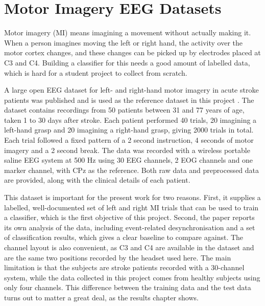 \section{Motor Imagery EEG Datasets}

Motor imagery (MI) means imagining a movement without actually making it. When a person
imagines moving the left or right hand, the activity over the motor cortex changes, and
these changes can be picked up by electrodes placed at C3 and C4. Building a classifier for
this needs a good amount of labelled data, which is hard for a student project to collect
from scratch.

A large open EEG dataset for left- and right-hand motor imagery in acute stroke patients
was published and is used as the reference dataset in this project \cite{liu2024mi}. The
dataset contains recordings from 50 patients between 31 and 77 years of age, taken 1 to 30
days after stroke. Each patient performed 40 trials, 20 imagining a left-hand grasp and 20
imagining a right-hand grasp, giving 2000 trials in total. Each trial followed a fixed
pattern of a 2 second instruction, 4 seconds of motor imagery and a 2 second break. The
data was recorded with a wireless portable saline EEG system at 500 Hz using 30 EEG
channels, 2 EOG channels and one marker channel, with CPz as the reference. Both raw data
and preprocessed data are provided, along with the clinical details of each patient.

This dataset is important for the present work for two reasons. First, it supplies a
labelled, well-documented set of left and right MI trials that can be used to train a
classifier, which is the first objective of this project. Second, the paper reports its own
analysis of the data, including event-related desynchronisation and a set of classification
results, which gives a clear baseline to compare against. The channel layout is also
convenient, as C3 and C4 are available in the dataset and are the same two positions
recorded by the headset used here. The main limitation is that the subjects are stroke
patients recorded with a 30-channel system, while the data collected in this project comes
from healthy subjects using only four channels. This difference between the training data
and the test data turns out to matter a great deal, as the results chapter shows.

